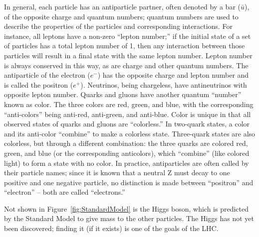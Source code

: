 In general, each particle has an antiparticle partner, 
often denoted by a bar ($\bar{u}$), 
of the opposite charge and quantum numbers; %
quantum numbers are used to describe the properties of the particles 
and corresponding interactions.  
For instance, all leptons have a non-zero ``lepton number;'' 
if the initial state of a set of particles 
has a total lepton number of 1, 
then any interaction between those particles will 
result in a final state with the same lepton number.  
Lepton number is always conserved in this way, 
as are charge and other quantum numbers.  
The antiparticle of the electron ($e^-$) 
has the opposite charge and lepton number 
and is called the positron ($e^+$).  
Neutrinos, being chargeless, 
have antineutrinos with opposite lepton number.  
Quarks and gluons have another quantum ``number'' known as color.   
The three colors are red, green, and blue, with the corresponding 
``anti-colors'' being anti-red, anti-green, and anti-blue.  
Color is unique in that all observed states of quarks and gluons 
are ``colorless.''
In two-quark states, a color and its anti-color ``combine'' to make a colorless state.  
Three-quark states are also colorless, but through a different combination: 
the three quarks are colored red, green, and blue 
(or the corresponding anticolors), which ``combine'' (like colored light) to form 
a state with no color. 
In practice, antiparticles are often called by their particle names; 
since it is known that a neutral Z must decay to one positive and one negative 
particle, no distinction is made between ``positron'' and ``electron'' -- 
both are called ``electrons.''  

Not shown in Figure~\ref{fig:StandardModel} is the Higgs boson, 
which is predicted by the Standard Model 
to give mass to the other particles.  
The Higgs has not yet been discovered; 
finding it (if it exists) is one of the 
goals of the LHC.  

